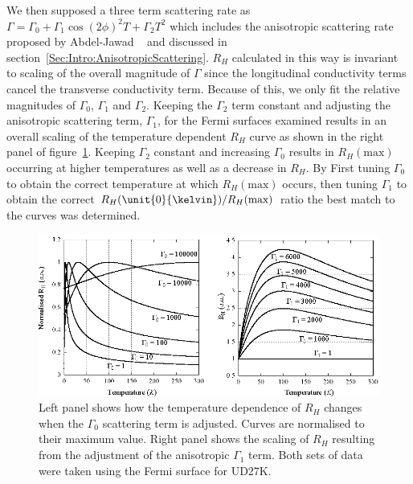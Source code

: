 We then supposed a three term scattering rate  as $\Gamma = \Gamma_0 + \Gamma_1 \cos(2\phi)^2 T + \Gamma_2 T^2$ which includes the anisotropic scattering rate proposed by Abdel-Jawad \etal~\cite{Abdel-Jawad2007} and discussed in section~\ref{Sec:Intro:AnisotropicScattering}. $R_H$ calculated in this way is invariant to scaling of the overall magnitude of $\Gamma$ since the longitudinal conductivity terms cancel the transverse conductivity term. Because of this, we only fit the relative magnitudes of $\Gamma_0$, $\Gamma_1$ and $\Gamma_2$. Keeping the $\Gamma_2$ term constant and adjusting the anisotropic scattering term, $\Gamma_1$, for the Fermi surfaces examined results in an overall scaling of the temperature dependent $R_H$ curve as shown in the right panel of figure~\ref{Fig:ResH:OngBehaviour}. Keeping $\Gamma_2$ constant and increasing $\Gamma_0$ results in $R_H(\textrm{max})$ occurring at higher temperatures as well as a decrease in $R_H$. By First tuning $\Gamma_0$ to obtain the correct temperature at which $R_H(\textrm{max})$ occurs, then tuning $\Gamma_1$ to obtain the correct $R_H(\unit{0}{\kelvin})/R_H(\textrm{max})$ ratio the best match to the curves was determined.
\begin{figure}[htbp]
    \begin{center}
        \includegraphics[scale=1.1]{Chapter-HallBSCO/Figures/OngBehaviour/OngBehaviour}
        \caption{Left panel shows how the temperature dependence of $R_H$ changes when the $\Gamma_0$ scattering term is adjusted. Curves are normalised to their maximum value. Right panel shows the scaling of $R_H$ resulting from the adjustment of the anisotropic $\Gamma_1$ term. Both sets of data were taken using the Fermi surface for UD27K.}
        \label{Fig:ResH:OngBehaviour}
    \end{center}
\end{figure}

